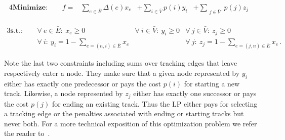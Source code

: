 		\begin{alignat*}{4}
		\textbf{Minimize:} &  & \ \ f = &\sum_{ e \in \bar{E} } \Delta(e) x_{e}  &+  \sum_{ i \in \bar{V}} p(i) y_{i} & +   \sum_{ \substack{j \in \bar{V}}} p(j) z_{j} &  
		\end{alignat*}

		\begin{alignat*}{3}
		  \textbf{s.t.:}
		        & \ \     & \forall \ e \in \bar{E} : \ x_{e} \ge 0  \quad \quad    & \forall \ i \in \bar{V} : \ y_{i} \ge 0                                          & \forall \ j \in \bar{V} : \ z_{j} \ge 0                                             \\
		        & \ \     & \forall \ i: \ y_{i} = 1 - \sum_{e = (n,i) \in \bar{E}} x_{e}                                          &                                                     & \forall \ j: \ z_{j} = 1 - \sum_{e = (j,n) \in \bar{E}} x_{e}\,.                     
		\end{alignat*}

		Note the last two constraints including sums over tracking edges that leave respectively enter a node. They make sure that a given node represented by $y_i$ either has exactly one predecessor or pays the cost $p(i)$ for starting a new track. Likewise, a node represented by $z_j$ either has exactly one successor or pays the cost $p(j)$ for ending an existing track. Thus the LP either pays for selecting a tracking edge or the penalties associated with ending or starting tracks but never both. For a more technical exposition of this optimization problem we refer the reader to~\cite{Karrenbauer2013}.

